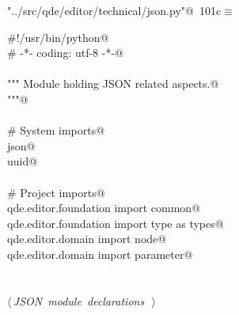 \documentclass[
    a4paper,      %
    10pt,         %
    openright,    %
    notitlepage,  %
    parskip=half, %
]{scrreprt}       %
\theoremstyle{definition}                    %
\begin{document}
\begin{flushleft} \small
\begin{minipage}{\linewidth}\label{scrap164}\raggedright\small
{} \verb@"../src/qde/editor/technical/json.py"@\nobreak\ {\footnotesize {101c}}$\equiv$
\vspace{-1ex}
\begin{list}{}{} \item
\mbox{}\lstinline@#!/usr/bin/python@\\
\mbox{}\lstinline@# -*- coding: utf-8 -*-@\\
\mbox{}\lstinline@@\\
\mbox{}\lstinline@""" Module holding JSON related aspects.@\\
\mbox{}\lstinline@"""@\\
\mbox{}\lstinline@@\\
\mbox{}\lstinline@# System imports@\\
\mbox{}\lstinline@import json@\\
\mbox{}\lstinline@import uuid@\\
\mbox{}\lstinline@@\\
\mbox{}\lstinline@# Project imports@\\
\mbox{}\lstinline@from qde.editor.foundation import common@\\
\mbox{}\lstinline@from qde.editor.foundation import type as types@\\
\mbox{}\lstinline@from qde.editor.domain import node@\\
\mbox{}\lstinline@from qde.editor.domain import parameter@\\
\mbox{}\lstinline@@\\
\mbox{}\lstinline@@\\
\mbox{}\lstinline@@\hbox{$\langle\,${\itshape JSON module declarations}\nobreak\ {\footnotesize {}}$\,\rangle$}\lstinline@@\\
\mbox{}\lstinline@@{\NWsep}
\end{list}
\vspace{-1.5ex}
\footnotesize
\begin{list}{}{\setlength{\itemsep}{-\parsep}\setlength{\itemindent}{-\leftmargin}}

\item{}
\end{list}
\end{minipage}\vspace{4ex}
\end{flushleft}
\end{document}

